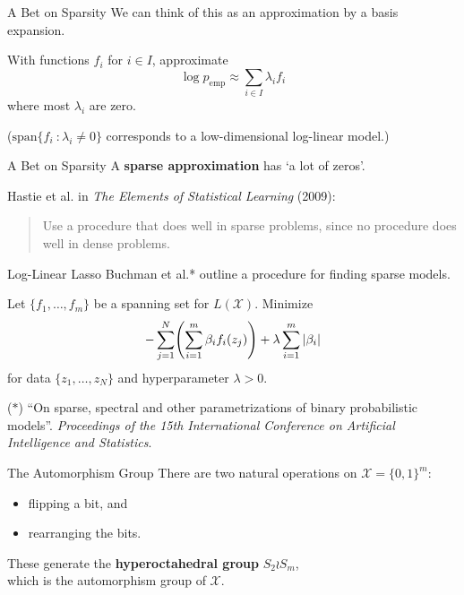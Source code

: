 \documentclass[xcolor=dvipsnames]{beamer}
\newcommand*{\xs}{\mathcal{X}}
\newcommand*{\emp}{\mathrm{emp}}
\begin{document}
\begin{frame}{A Bet on Sparsity}
    We can think of this as an approximation by a basis expansion. 

    With functions $f_i$ for $i \in I$, approximate
    \[
        \log p_\emp \approx \sum_{i \in I} \lambda_i f_i
    \]
    where most $\lambda_i$ are zero.

    ($\mathrm{span}\{f_i \:: \lambda_i \ne 0\}$ corresponds to a low-dimensional log-linear
    model.)
\end{frame}

\begin{frame}{A Bet on Sparsity}
    A \textbf{sparse approximation} has `a lot of zeros'. 
    
    Hastie et al. in \emph{The Elements of Statistical Learning} (2009):
    \begin{quote}
        Use a procedure that does well in sparse problems, since no procedure
        does well in dense problems.
    \end{quote}
\end{frame}

\begin{frame}{Log-Linear Lasso}
    \lspace
    Buchman et al.* outline a procedure for finding sparse models.

    Let $\{f_1, \ldots, f_m\}$ be a spanning set for $L(\xs)$.  Minimize
    \[
        -\sum_{j=1}^N \pdel*{\sum_{i=1}^m \beta_i f_i(z_j)}
        + \lambda \sum_{i=1}^m |\beta_i|
    \]
    for data $\{z_1, \ldots, z_N\}$ and hyperparameter $\lambda > 0$.

    \lspace
    {\footnotesize
        ($*$) ``On sparse, spectral and other parametrizations of binary probabilistic
        models''.  \emph{Proceedings of the 15th International Conference on
        Artificial Intelligence and Statistics}.
    }
\end{frame}

\begin{frame}{The Automorphism Group}
    There are two natural operations on $\xs = \{0, 1\}^m$:
    \begin{itemize}
    \item flipping a bit, and
    \item rearranging the bits.
    \end{itemize}

    These generate the \textbf{hyperoctahedral group} $S_2 \wr S_m$,  \\
    which is the automorphism group of $\xs$.
\end{frame}
\end{document}
